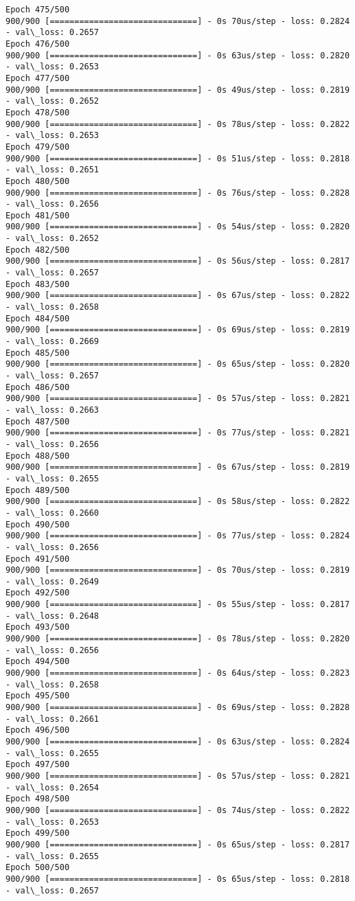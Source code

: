 \documentclass[11pt]{article}
\begin{document}
\begin{Verbatim}[commandchars=\\\{\}]
Epoch 475/500
900/900 [==============================] - 0s 70us/step - loss: 0.2824 - val\_loss: 0.2657
Epoch 476/500
900/900 [==============================] - 0s 63us/step - loss: 0.2820 - val\_loss: 0.2653
Epoch 477/500
900/900 [==============================] - 0s 49us/step - loss: 0.2819 - val\_loss: 0.2652
Epoch 478/500
900/900 [==============================] - 0s 78us/step - loss: 0.2822 - val\_loss: 0.2653
Epoch 479/500
900/900 [==============================] - 0s 51us/step - loss: 0.2818 - val\_loss: 0.2651
Epoch 480/500
900/900 [==============================] - 0s 76us/step - loss: 0.2828 - val\_loss: 0.2656
Epoch 481/500
900/900 [==============================] - 0s 54us/step - loss: 0.2820 - val\_loss: 0.2652
Epoch 482/500
900/900 [==============================] - 0s 56us/step - loss: 0.2817 - val\_loss: 0.2657
Epoch 483/500
900/900 [==============================] - 0s 67us/step - loss: 0.2822 - val\_loss: 0.2658
Epoch 484/500
900/900 [==============================] - 0s 69us/step - loss: 0.2819 - val\_loss: 0.2669
Epoch 485/500
900/900 [==============================] - 0s 65us/step - loss: 0.2820 - val\_loss: 0.2657
Epoch 486/500
900/900 [==============================] - 0s 57us/step - loss: 0.2821 - val\_loss: 0.2663
Epoch 487/500
900/900 [==============================] - 0s 77us/step - loss: 0.2821 - val\_loss: 0.2656
Epoch 488/500
900/900 [==============================] - 0s 67us/step - loss: 0.2819 - val\_loss: 0.2655
Epoch 489/500
900/900 [==============================] - 0s 58us/step - loss: 0.2822 - val\_loss: 0.2660
Epoch 490/500
900/900 [==============================] - 0s 77us/step - loss: 0.2824 - val\_loss: 0.2656
Epoch 491/500
900/900 [==============================] - 0s 70us/step - loss: 0.2819 - val\_loss: 0.2649
Epoch 492/500
900/900 [==============================] - 0s 55us/step - loss: 0.2817 - val\_loss: 0.2648
Epoch 493/500
900/900 [==============================] - 0s 78us/step - loss: 0.2820 - val\_loss: 0.2656
Epoch 494/500
900/900 [==============================] - 0s 64us/step - loss: 0.2823 - val\_loss: 0.2658
Epoch 495/500
900/900 [==============================] - 0s 69us/step - loss: 0.2828 - val\_loss: 0.2661
Epoch 496/500
900/900 [==============================] - 0s 63us/step - loss: 0.2824 - val\_loss: 0.2655
Epoch 497/500
900/900 [==============================] - 0s 57us/step - loss: 0.2821 - val\_loss: 0.2654
Epoch 498/500
900/900 [==============================] - 0s 74us/step - loss: 0.2822 - val\_loss: 0.2653
Epoch 499/500
900/900 [==============================] - 0s 65us/step - loss: 0.2817 - val\_loss: 0.2655
Epoch 500/500
900/900 [==============================] - 0s 65us/step - loss: 0.2818 - val\_loss: 0.2657

    \end{Verbatim}
\end{document}
